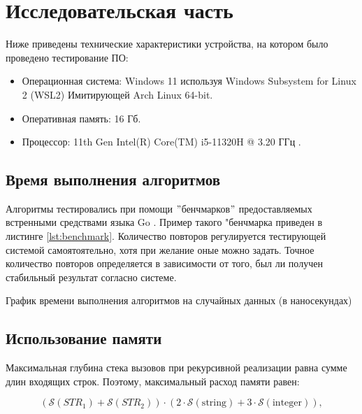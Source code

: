 \chapter{Исследовательская часть}
Ниже приведены технические характеристики устройства, на котором было проведено тестирование ПО:

\begin{itemize}
    \item Операционная система: Windows 11 используя Windows Subsystem for Linux 2 (WSL2) \cite{wsl2} Имитирующей Arch Linux \cite{arch} 64-bit.
    \item Оперативная память: 16 Гб.
    \item Процессор: 11th Gen Intel(R) Core(TM) i5-11320H @ 3.20 ГГц \cite{i5}.
\end{itemize}

\section{Время выполнения алгоритмов}
Алгоритмы тестировались при помощи \("\)бенчмарков\("\) предоставляемых встренными средствами языка Go \cite{go}.
Пример такого "бенчмарка приведен в листинге \ref{lst:benchmark}.
Количество повторов регулируется тестирующей системой самоятоятельно, хотя при желание оные можно задать.
Точное количество повторов определяется в зависимости от того, был ли получен стабильный результат согласно системе.



График времени выполнения алгоритмов на случайных данных (в наносекундах)\newline
%
\section{Использование памяти}

Максимальная глубина стека вызовов при рекурсивной реализации равна сумме длин входящих строк. Поэтому, максимальный расход памяти равен:

\begin{equation}
(\mathcal{S}(STR_1) + \mathcal{S}(STR_2)) \cdot (2 \cdot \mathcal{S}\mathrm{(string)} + 3 \cdot \mathcal{S}\mathrm{(integer)}),
\end{equation}

